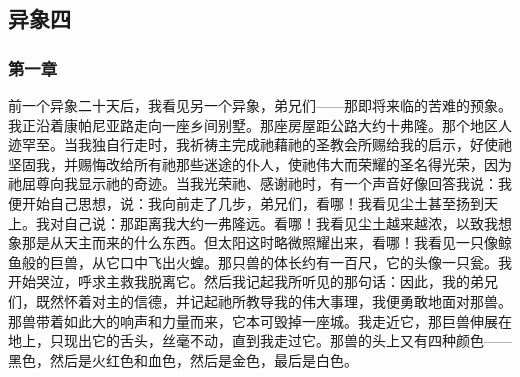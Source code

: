 \par


\subsection{异象四}

\par


\subsubsection{第一章}

前一个异象二十天后，我看见另一个异象，弟兄们——那即将来临的苦难的预象。我正沿着康帕尼亚路走向一座乡间别墅。那座房屋距公路大约十弗隆。那个地区人迹罕至。当我独自行走时，我祈祷主完成祂藉祂的圣教会所赐给我的启示，好使祂坚固我，并赐悔改给所有祂那些迷途的仆人，使祂伟大而荣耀的圣名得光荣，因为祂屈尊向我显示祂的奇迹。当我光荣祂、感谢祂时，有一个声音好像回答我说：我便开始自己思想，说：我向前走了几步，弟兄们，看哪！我看见尘土甚至扬到天上。我对自己说：那距离我大约一弗隆远。看哪！我看见尘土越来越浓，以致我想象那是从天主而来的什么东西。但太阳这时略微照耀出来，看哪！我看见一只像鲸鱼般的巨兽，从它口中飞出火蝗。那只兽的体长约有一百尺，它的头像一只瓮。我开始哭泣，呼求主救我脱离它。然后我记起我所听见的那句话：因此，我的弟兄们，既然怀着对主的信德，并记起祂所教导我的伟大事理，我便勇敢地面对那兽。那兽带着如此大的响声和力量而来，它本可毁掉一座城。我走近它，那巨兽伸展在地上，只现出它的舌头，丝毫不动，直到我走过它。那兽的头上又有四种颜色——黑色，然后是火红色和血色，然后是金色，最后是白色。\par

